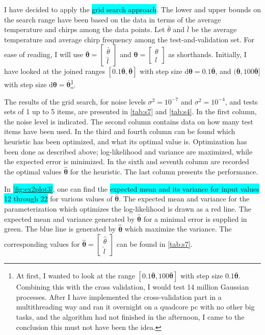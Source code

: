 \documentclass[a4paper,11pt]{article}
\newcommand{\V}[1]{\ensuremath{\boldsymbol{#1}}}
\newcommand{\dif}{\ensuremath{\mathrm{d}}}
\newcommand{\hl}[1]{\colorbox{cyan}{#1}}
\begin{document}
I have decided to apply the \hl{grid search approach}.  The lower and upper bounds on the search range have been based on the data in terms of the average temperature and chirps among the data points.  Let $\bar\theta$ and $\bar l$ be the average temperature and average chirp frequency among the test-and-validation set.  For ease of reading, I will use $\V{\bar\theta} = \begin{bmatrix}\bar\theta\\\bar l\end{bmatrix}$ and $\V{\theta} = \begin{bmatrix}\theta\\l\end{bmatrix}$ as shorthands.  Initially, I have looked at the joined ranges $[0.1\V{\bar\theta}, \V{\bar\theta}]$ with step size $\dif \V{\theta} = 0.1\V{\bar\theta}$, and $(\V{\bar\theta}, 100 \V{\bar\theta}]$ with step size $\dif \V{\theta} = \V{\bar\theta}$\footnote{At first, I wanted to look at the range $[0.1\V{\bar\theta}, 100\V{\bar\theta}]$ with step size $0.1\V{\bar\theta}$. Combining this with the cross validation, I would test 14 million Gaussian processes.  After I have implemented the cross-validation part in a multithreading way and ran it overnight on a quadcore pc with no other big tasks, and the algorithm had not finished in the afternoon, I came to the conclusion this must not have been the idea.}.  %

The results of the grid search, for noise levels $\sigma^2 = 10^{-7}$ and $\sigma^2 = 10^{-4}$, and tests sets of 1 up to 5 items, are presented in \autoref{tab:s7} and \autoref{tab:s4}.  In the first column, the noise level is indicated.  The second column contains data on how many test items have been used.  In the third and fourth column can be found which heuristic has been optimized, and what its optimal value is.  Optimization has been done as described above; log-likelihood and variance are maximized, while the expected error is minimized.  In the sixth and seventh column are recorded the optimal values $\V{\hat\theta}$ for the heuristic.  The last column presents the performance.

In \hl{\autoref{fig:ex2plot3}}, one can find the \hl{expected mean and its variance for input values 12 through 22} for various values of $\V{\hat\theta}$.  The expected mean and variance for the parameterization which optimizes the log-likelihood is drawn as a red line.  The expected mean and variance generated by $\V{\hat\theta}$ for a minimal error is supplied in green.  The blue line is generated by $\V{\hat\theta}$ which maximize the variance.  The corresponding values for $\V{\hat\theta} = \begin{bmatrix}\hat\theta \\\hat l\end{bmatrix}$ can be found in \autoref{tab:s7}.
\end{document}
